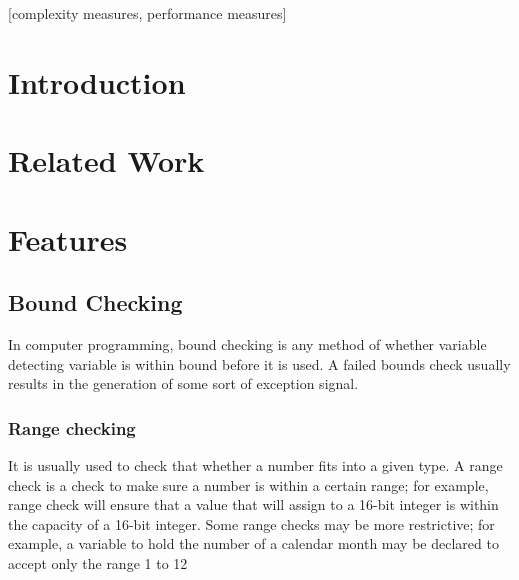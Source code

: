 \documentclass{sig-alternate}
\begin{document}
\maketitle
\begin{abstract}

\end{abstract}

[complexity measures, performance measures]



\section{Introduction}

\section{Related Work}

\section{Features}

\subsection{Bound Checking}
In computer programming, bound checking is any method of whether variable detecting variable is within bound before it is used.  A failed bounds check usually results in the generation of some sort of exception signal.
\subsubsection{Range checking}
It is usually used to check that whether a number fits into a given type. A range check is a check to make sure a number is within a certain range; for example, range check will ensure that a value that will assign to a 16-bit integer is within the capacity of a 16-bit integer. Some range checks may be more restrictive; for example, a variable to hold the number of a calendar month may be declared to accept only the range 1 to 12
\end{document}
